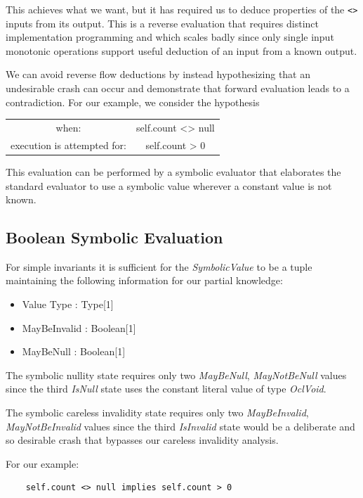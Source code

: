 \documentclass[
]{ceurart}
\begin{document}
This achieves what we want, but it has required us to deduce properties of the \verb|<>| inputs from its output. This is a reverse evaluation that requires distinct implementation programming and which scales badly since only single input monotonic operations support useful deduction of an input from a known output.

We can avoid reverse flow deductions by instead hypothesizing that an undesirable crash can occur and demonstrate that forward evaluation leads to a contradiction. For our example, we consider the hypothesis

\begin{center}
	\begin{tabular}{c c}
		when: & self.count <> null \\
		execution is attempted for: & self.count > 0 \\
	\end{tabular}
\end{center}

This evaluation can be performed by a symbolic evaluator that elaborates the standard evaluator to use a symbolic value wherever a constant value is not known.

\subsection{Boolean Symbolic Evaluation}

For simple invariants it is sufficient for the \emph{SymbolicValue} to be a tuple maintaining the following information for our partial knowledge:
\begin{itemize}
	\item Value Type : Type[1]
	\item MayBeInvalid : Boolean[1]
	\item MayBeNull : Boolean[1]
\end{itemize}

The symbolic nullity state requires only two \emph{MayBeNull}, \emph{MayNotBeNull} values since the third \emph{IsNull} state uses the constant literal value of type \emph{OclVoid}.

The symbolic careless invalidity state requires only two \emph{MayBeInvalid}, \emph{MayNotBeInvalid} values since the third \emph{IsInvalid} state would be a deliberate and so desirable crash that bypasses our careless invalidity analysis.

For our example:

\begin{verbatim}
    self.count <> null implies self.count > 0
\end{verbatim}
\end{document}
